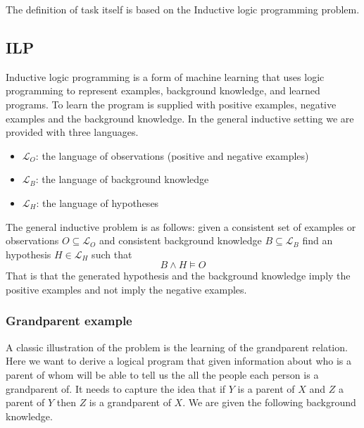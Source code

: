 The definition of task itself is based on the Inductive logic programming problem.

\subsection{ILP}\label{sec:ILP}
Inductive logic programming is a form of machine learning that uses logic programming to represent examples, background knowledge, and learned programs\cite{Cropper/EfficientLearning}. To learn the program is supplied with positive examples, negative examples and the background knowledge. In the general inductive setting we are provided with three languages.
\begin{itemize}
\item $\mathcal{L}_O$: the language of observations (positive and negative examples)
\item $\mathcal{L}_B$: the language of background knowledge
\item $\mathcal{L}_H$: the language of hypotheses
\end{itemize}
The general inductive problem is as follows: given a consistent set of examples or observations $O \subseteq \mathcal{L}_O$ and consistent background knowledge $B \subseteq \mathcal{L}_B$ find an hypothesis $H \in \mathcal{L}_H$ such that \[B \wedge H \vDash O\] \cite{Muggleton/ILP}
That is that the generated hypothesis and the background knowledge imply the positive examples and not imply the negative examples.

\subsubsection{Grandparent example}
A classic illustration of the problem is the learning of the grandparent relation. Here we want to derive a logical program that given information about who is a parent of whom will be able to tell us the all the people each person is a grandparent of. It needs to capture the idea that if $Y$ is a parent of $X$ and $Z$ a parent of $Y$ then $Z$ is a grandparent of $X$. We are given the following background knowledge.

